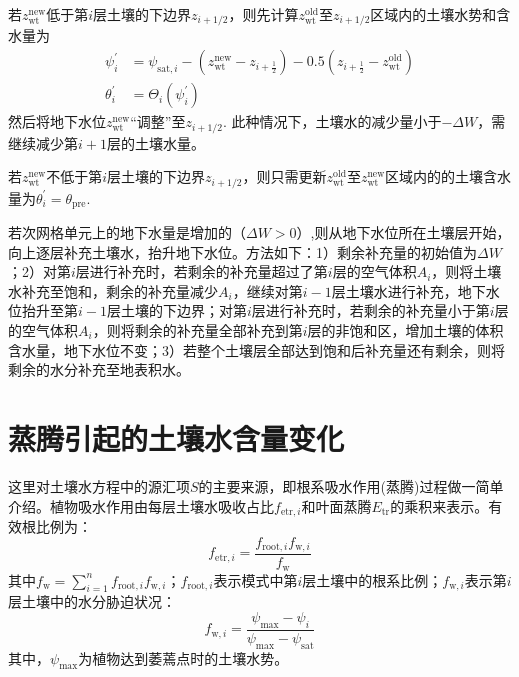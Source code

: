 若$z_{\mathrm{wt}}^{\mathrm{new}}$低于第$i$层土壤的下边界$z_{i+1/2}$，则先计算$z_{\mathrm{wt}}^{\mathrm{old}}$至$z_{i+1/2}$区域内的土壤水势和含水量为
\begin{equation} \label{formula:adjust_zwt1}
  \begin{aligned}
    \psi_i^{\prime} & = \psi_{\mathrm{sat},i} - \left(z_{\mathrm{wt}}^{\mathrm{new}} - z_{i+\frac{1}{2}}\right) -0.5\left( z_{i+\frac{1}{2}} - z_{\mathrm{wt}}^{\mathrm{old}}\right) \\
    \theta_i^{\prime} & = \Theta_i\left(\psi_i^{\prime}\right)
  \end{aligned}
\end{equation}
然后将地下水位$z_{\mathrm{wt}}^{\mathrm{new}}$“调整”至$z_{i+1/2}$. 此种情况下，土壤水的减少量小于$- \Delta W$，需继续减少第$i+1$层的土壤水量。

若$z_{\mathrm{wt}}^{\mathrm{new}}$不低于第$i$层土壤的下边界$z_{i+1/2}$，则只需更新$z_{\mathrm{wt}}^{\mathrm{old}}$至$z_{\mathrm{wt}}^{\mathrm{new}}$区域内的的土壤含水量为$\theta_i^{\prime} = \theta_{\mathrm{pre}}$.


若次网格单元上的地下水量是增加的（$\Delta W > 0$）,则从地下水位所在土壤层开始，向上逐层补充土壤水，抬升地下水位。方法如下：1）剩余补充量的初始值为$\Delta W$；2）对第$i$层进行补充时，若剩余的补充量超过了第$i$层的空气体积$A_i$，则将土壤水补充至饱和，剩余的补充量减少$A_i$，继续对第$i-1$层土壤水进行补充，地下水位抬升至第$i-1$层土壤的下边界；对第$i$层进行补充时，若剩余的补充量小于第$i$层的空气体积$A_i$，则将剩余的补充量全部补充到第$i$层的非饱和区，增加土壤的体积含水量，地下水位不变；3）若整个土壤层全部达到饱和后补充量还有剩余，则将剩余的水分补充至地表积水。



\section{蒸腾引起的土壤水含量变化}

这里对土壤水方程中的源汇项$S$的主要来源，即根系吸水作用(蒸腾)过程做一简单介绍。植物吸水作用由每层土壤水吸收占比$f_{\mathrm{etr},i}$和叶面蒸腾$E_{\mathrm{tr}}$的乘积来表示\citep{dai2003common}。有效根比例为：
\begin{equation}
  {f}_{\mathrm{ {etr }}, {i}}=\frac{{f}_{\mathrm{{root}}, {i}} {f}_{\mathrm{w},i}}{f_{\mathrm{w}}}
\end{equation}
其中$f_{\mathrm{w}} = \sum_{i=1}^{n}{f_{\mathrm{root},i}}f_{\mathrm{w},i}$；$f_{\mathrm{root},i}$表示模式中第$i$层土壤中的根系比例；$f_{\mathrm{w},i}$表示第$i$层土壤中的水分胁迫状况：
\begin{equation}
  {f}_{\mathrm{w},i}=\frac{\psi_{\max }-\psi_{i}}{\psi_{\max }-\psi_{\mathrm{sat}}}
\end{equation}
其中，$\psi_{\mathrm{max}}$为植物达到萎蔫点时的土壤水势。

